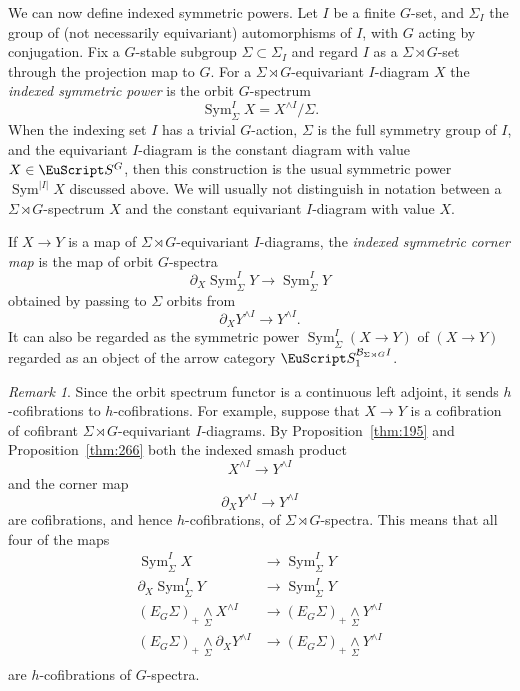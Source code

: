 \documentclass{amsart}
\newtheorem{rem}[equation]{Remark}
\theoremstyle{definition}
\theoremstyle{remark}
\newtheorem{rem}[equation]{Remark}
\DeclareMathOperator{\sym}{Sym}
\newcommand{\spectra}{\EuScript S}
\newcommand{\smashove}[1]{\underset{#1}{\wedge}}
\newcommand{\ugspectra}[1]{\spectra^{#1}}
\newcommand{\cat}[1]{{\mathcal #1}}
\newcommand{\eggroup}[2]{E_{#1}#2}
\newcommand{\egsigma}[1]{\eggroup{#1}{\Sigma}}
\newcommand{\augspectra}[1]{\spectra_{1}^{#1}}
\begin{document}
We can now define indexed symmetric powers.   Let $I$ be a finite
$G$-set, and $\Sigma_{I}$ the group of (not necessarily equivariant)
automorphisms of $I$, with $G$ acting by conjugation.  Fix a
$G$-stable subgroup $\Sigma\subset \Sigma_{I}$ and regard $I$ as a
$\Sigma\rtimes G$-set through the projection map to $G$.  For a
$\Sigma\rtimes G$-equivariant $I$-diagram $X$ the {\em indexed
symmetric power} is the orbit $G$-spectrum
\[
\sym^{I}_{\Sigma}X = X^{\wedge I}/\Sigma.
\]
When the indexing set $I$ has a trivial $G$-action, $\Sigma$ is the
full symmetry group of $I$, and the equivariant $I$-diagram is the
constant diagram with value $X\in\ugspectra{G}$, then this construction is
the usual symmetric power $\sym^{|I|}X$ discussed above.   We will
usually not distinguish in notation between a $\Sigma\rtimes
G$-spectrum $X$ and the constant equivariant $I$-diagram with value $X$.

If $X\to Y$ is a map of $\Sigma\rtimes G$-equivariant $I$-diagrams,
the {\em indexed symmetric corner map} is the map of orbit $G$-spectra
\[
\partial_{X}\sym^{I}_{\Sigma}Y \to \sym^{I}_{\Sigma}Y
\]
obtained by passing to $\Sigma$ orbits from 
\[
\partial_{X}Y^{\wedge I}\to Y^{\wedge I}.
\]
It can also be regarded as the symmetric power $\sym^{I}_{\Sigma}(X\to
Y)$ of $(X\to Y)$ regarded as an object of the arrow category
$\augspectra{\cat{B}_{\Sigma\rtimes G}I}$.



\begin{rem}
\label{rem:73} Since the orbit spectrum functor is a continuous left
adjoint, it sends $h$-cofibrations to $h$-cofibrations.   For example, 
suppose that $X\to Y$ is a cofibration of cofibrant
$\Sigma\rtimes G$-equivariant $I$-diagrams.  By
Proposition~\ref{thm:195} and Proposition~\ref{thm:266} both the
indexed smash product
\[
X^{\wedge I}\to Y^{\wedge I}
\]
and the corner map
\[
\partial_{X}Y^{\wedge I}\to Y^{\wedge I}
\]
are cofibrations, and hence $h$-cofibrations, of $\Sigma\rtimes
G$-spectra.  This means that all four of the maps
\begin{align*}
\sym^{I}_{\Sigma}X&\to \sym^{I}_{\Sigma}Y \\
\partial_{X}\sym^{I}_{\Sigma} Y&\to \sym^{I}_{\Sigma}Y \\
(\egsigma{G})_{+}\smashove{\Sigma}X^{\wedge I} &\to
(\egsigma{G})_{+}\smashove{\Sigma}Y^{\wedge I} \\
(\egsigma{G})_{+}\smashove{\Sigma}\partial_{X}Y^{\wedge I} &\to
(\egsigma{G})_{+}\smashove{\Sigma}Y^{\wedge I} \\
\end{align*}
are $h$-cofibrations of $G$-spectra.
\end{rem}
\end{document}
